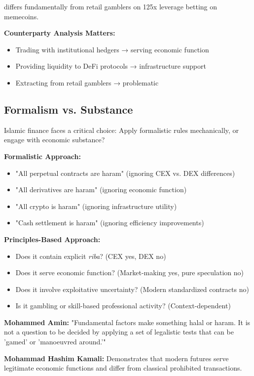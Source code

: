 \documentclass[10pt,twocolumn]{article}
\begin{document}
differs fundamentally from retail gamblers on 125x leverage betting on memecoins.

\textbf{Counterparty Analysis Matters:}
\begin{itemize}
    \item Trading with institutional hedgers → serving economic function
    \item Providing liquidity to DeFi protocols → infrastructure support
    \item Extracting from retail gamblers → problematic
\end{itemize}

\subsection{Formalism vs. Substance}

Islamic finance faces a critical choice: Apply formalistic rules mechanically, or engage with economic substance?

\textbf{Formalistic Approach:}
\begin{itemize}
    \item "All perpetual contracts are haram" (ignoring CEX vs. DEX differences)
    \item "All derivatives are haram" (ignoring economic function)
    \item "All crypto is haram" (ignoring infrastructure utility)
    \item "Cash settlement is haram" (ignoring efficiency improvements)
\end{itemize}

\textbf{Principles-Based Approach:}
\begin{itemize}
    \item Does it contain explicit \textit{riba}? (CEX yes, DEX no)
    \item Does it serve economic function? (Market-making yes, pure speculation no)
    \item Does it involve exploitative uncertainty? (Modern standardized contracts no)
    \item Is it gambling or skill-based professional activity? (Context-dependent)
\end{itemize}

\textbf{Mohammed Amin:} "Fundamental factors make something halal or haram. It is not a question to be decided by applying a set of legalistic tests that can be 'gamed' or 'manoeuvred around.'"

\textbf{Mohammad Hashim Kamali:} Demonstrates that modern futures serve legitimate economic functions and differ from classical prohibited transactions.
\end{document}
